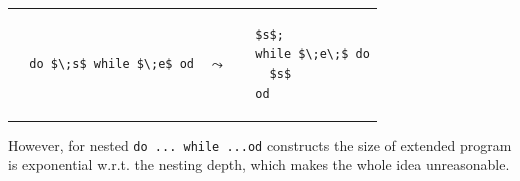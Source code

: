 \documentclass{article}
\theoremstyle{definition}
\begin{document}
\begin{tabular}{p{5cm}p{1cm}p{3cm}}
\begin{lstlisting}
  do $\;s$ while $\;e$ od
\end{lstlisting} &
\begin{center}
  $\leadsto$
\end{center} &
\begin{lstlisting}
  $s$;
  while $\;e\;$ do
    $s$
  od
\end{lstlisting}
\end{tabular}

However, for nested \lstinline{do ... while ...od} constructs the size of extended program is exponential w.r.t. the nesting depth, which makes the whole idea unreasonable.
\end{document}
